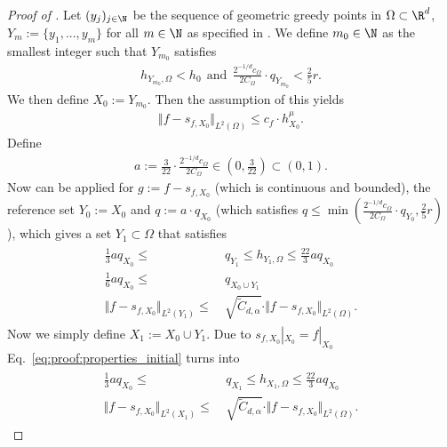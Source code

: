 \documentclass[a4paper, 10pt]{article}
\begin{document}
\begin{proof}[Proof of ]
Let $(y_j)_{j \in \N}$ be the sequence of geometric greedy points in $\Omega \subset \R^d$, $Y_m := \{ y_1, ..., y_m \}$ for all $m \in \N$ as specified in .
We define $m_0 \in \N$ as the smallest integer such that $Y_{m_0}$ satisfies 
\begin{align*}
h_{Y_{m_0}, \Omega} < h_0 ~~ \text{and} ~~ \frac{2^{-1/d}c_\Omega}{2C_\Omega} \cdot q_{Y_{m_0}} < \frac{2}{5}r.
\end{align*}
We then define $X_0 := Y_{m_0}$. 
Then the assumption of this  yields
\begin{align*}
\Vert f - s_{f, X_{0}} \Vert_{L^2(\Omega)} \leq c_f \cdot h_{X_{0}}^\mu.
\end{align*}
Define 
\begin{align}
a := \frac{3}{22} \cdot \frac{2^{-1/d} c_\Omega}{2C_\Omega} \in \left( 0, \frac{3}{22} \right) \subset (0, 1).
\end{align}
%
%
Now  can be applied for $g := f - s_{f, X_{0}}$ (which is continuous and bounded),
the reference set $Y_0 := X_0$ and $q := a \cdot q_{X_{0}}$ (which satisfies $q \leq \min \left( \frac{2^{-1/d} c_\Omega}{2 C_\Omega} \cdot q_{Y_0}, \frac{2}{5}r \right)$ ), 
which gives a set $Y_1 \subset \Omega$ that satisfies
\begin{align}
\begin{aligned}
\label{eq:proof:properties_initial}
\frac{1}{3} a q_{X_{0}} \leq& ~ q_{Y_{1}} \leq h_{Y_{1}, \Omega} \leq \frac{22}{3} a  q_{X_{0}} \\
\frac{1}{6} aq_{X_{0}} \leq& ~ q_{X_{0} \cup Y_{1}} \\
\Vert f - s_{f, X_{0}} \Vert_{L^2(Y_{1})} \leq& ~ \sqrt{\tilde{C}_{d, \alpha}} \cdot \Vert f - s_{f, X_{0}} \Vert_{L^2(\Omega)}.
\end{aligned}
\end{align}
Now we simply define $X_1 := X_0 \cup Y_1$. Due to $s_{f, X_0}|_{X_0} = f|_{X_0}$ Eq.~\eqref{eq:proof:properties_initial} turns into
\begin{align}
\begin{aligned}
\label{eq:proof:properties_initial2}
\frac{1}{3} a q_{X_{0}} \leq& ~ q_{X_{1}} \leq h_{X_{1}, \Omega} \leq \frac{22}{3} a  q_{X_{0}} \\
\Vert f - s_{f, X_{0}} \Vert_{L^2(X_{1})} \leq& ~ \sqrt{\tilde{C}_{d, \alpha}} \cdot \Vert f - s_{f, X_{0}} \Vert_{L^2(\Omega)}.

\end{aligned}
\end{align}
\end{proof}
\end{document}

